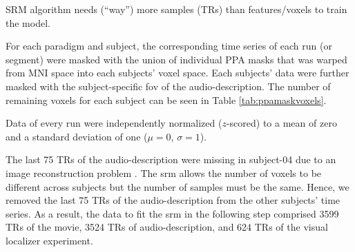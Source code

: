 



SRM algorithm needs (``way'') more samples (TRs) than features/voxels to train
the model.

For each paradigm and subject, the corresponding time series of each run (or
segment) were masked with the union of individual PPA masks
\citep[s.][]{haeusler2022processing} that was warped from MNI space into each
subjects' voxel space.
Each subjects' data were further masked with the subject-specific \ac{fov} of
the audio-description.
%
The number of remaining voxels for each subject can be seen in Table
\ref{tab:ppamaskvoxels}.


Data of every run were independently normalized ($z$-scored) to a mean of zero
and a standard deviation of one ($\mu=0$, $\sigma=1$).



%
The last 75 TRs of the audio-description were missing in subject-04 due to an
image reconstruction problem \citep[s.][]{hanke2014audiomovie}.
%
The \ac{srm} allows the number of voxels to be different across subjects but the
number of samples must be the same.
%
Hence, we removed the last 75 TRs of the audio-description from the other
subjects' time series.
As a result, the data to fit the \ac{srm} in the following step comprised 3599
TRs of the movie, 3524 TRs of audio-description, and 624 TRs of the visual
localizer experiment.


